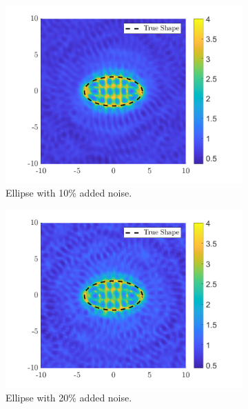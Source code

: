 \documentclass[]{article}
\begin{document}
				\begin{figure}[h]
					\centering
					\begin{subfigure}{.3\textwidth}
						\centering
						\includegraphics[width = \textwidth]{Numeric Simulations/Images/ellipse-10-noise-reconstructed}
						\caption{Ellipse with 10\% added noise.}
					\end{subfigure}
					\begin{subfigure}{.3\textwidth}
						\centering
						\includegraphics[width = \textwidth]{Numeric Simulations/Images/ellipse-20-noise-reconstructed}
						\caption{Ellipse with 20\% added noise.}
					\end{subfigure}
					\begin{subfigure}{.3\textwidth}

\end{subfigure}
\end{figure}
\end{document}

